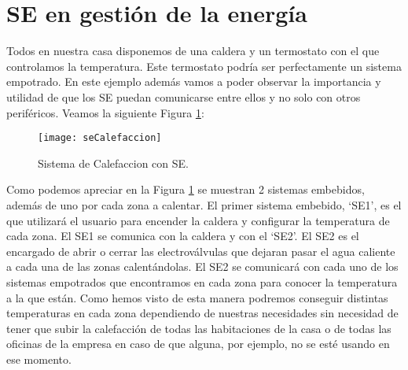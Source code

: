 \section{SE en gestión de la energía}\label{sec:TRGestionEnergetica}

Todos en nuestra casa disponemos de una caldera y un termostato con el que controlamos la temperatura. Este termostato podría ser perfectamente un sistema empotrado. En este ejemplo además vamos a poder observar la importancia y utilidad de que los SE puedan comunicarse entre ellos y no solo con otros periféricos. Veamos la siguiente Figura \ref{CalefaccionSE}:

\begin{figure}[!h]
	\centering
	\texttt{[image: seCalefaccion]}
	\caption{Sistema de Calefaccion con SE.}\label{CalefaccionSE}
\end{figure}

Como podemos apreciar en la Figura \ref{CalefaccionSE} se muestran 2 sistemas embebidos, además de uno por cada zona a calentar. El primer sistema embebido, `SE1', es el que utilizará el usuario para encender la caldera y configurar la temperatura de cada zona. El SE1 se comunica con la caldera y con el `SE2'. El SE2 es el encargado de abrir o cerrar las electroválvulas que dejaran pasar el agua caliente a cada una de las zonas calentándolas. El SE2 se comunicará con cada uno de los sistemas empotrados que encontramos en cada zona para conocer la temperatura a la que están. 
Como hemos visto de esta manera podremos conseguir distintas temperaturas en cada zona dependiendo de nuestras necesidades sin necesidad de tener que subir la calefacción de todas las habitaciones de la casa o de todas las oficinas de la empresa en caso de que alguna, por ejemplo, no se esté usando en ese momento.


